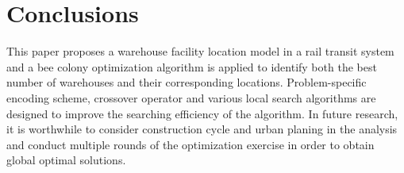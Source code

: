 \section{Conclusions}
This paper proposes a warehouse facility location model in a rail transit system and a bee colony optimization algorithm is applied to identify both the best number of warehouses and their corresponding locations.
Problem-specific encoding scheme, crossover operator and various local search algorithms  are designed to improve the searching efficiency of the algorithm.
In future research, it is worthwhile to consider construction cycle and urban planing in the analysis and conduct multiple rounds of the optimization exercise in order to obtain global optimal solutions.
